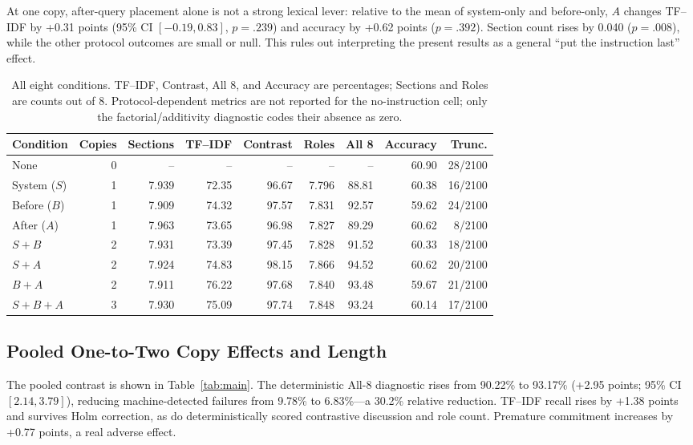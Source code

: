 \documentclass[10pt]{article}
\begin{document}
At one copy, after-query placement alone is not a strong lexical lever: relative to the mean of system-only and before-only, $A$ changes TF--IDF by +0.31 points (95\% CI $[-0.19,0.83]$, $p=.239$) and accuracy by +0.62 points ($p=.392$). Section count rises by 0.040 ($p=.008$), while the other protocol outcomes are small or null. This rules out interpreting the present results as a general ``put the instruction last'' effect.

\begin{table}[t]
\centering
\small
\setlength{\tabcolsep}{5.4pt}
\begin{tabular}{@{}lrrrrrrrr@{}}
\toprule
Condition & Copies & Sections & TF--IDF & Contrast & Roles & All 8 & Accuracy & Trunc.\\
\midrule
None & 0 & -- & -- & -- & -- & -- & 60.90 & 28/2100\\
System ($S$) & 1 & 7.939 & 72.35 & 96.67 & 7.796 & 88.81 & 60.38 & 16/2100\\
Before ($B$) & 1 & 7.909 & 74.32 & 97.57 & 7.831 & 92.57 & 59.62 & 24/2100\\
After ($A$) & 1 & 7.963 & 73.65 & 96.98 & 7.827 & 89.29 & 60.62 & 8/2100\\
$S+B$ & 2 & 7.931 & 73.39 & 97.45 & 7.828 & 91.52 & 60.33 & 18/2100\\
$S+A$ & 2 & 7.924 & 74.83 & 98.15 & 7.866 & 94.52 & 60.62 & 20/2100\\
$B+A$ & 2 & 7.911 & 76.22 & 97.68 & 7.840 & 93.48 & 59.67 & 21/2100\\
$S+B+A$ & 3 & 7.930 & 75.09 & 97.74 & 7.848 & 93.24 & 60.14 & 17/2100\\
\bottomrule
\end{tabular}
\caption{All eight conditions. TF--IDF, Contrast, All 8, and Accuracy are percentages; Sections and Roles are counts out of 8. Protocol-dependent metrics are not reported for the no-instruction cell; only the factorial/additivity diagnostic codes their absence as zero.}
\label{tab:conditions}
\end{table}
\FloatBarrier

\subsection{Pooled One-to-Two Copy Effects and Length}
The pooled contrast is shown in Table~\ref{tab:main}. The deterministic All-8 diagnostic rises from 90.22\% to 93.17\% (+2.95 points; 95\% CI $[2.14,3.79]$), reducing machine-detected failures from 9.78\% to 6.83\%---a 30.2\% relative reduction. TF--IDF recall rises by +1.38 points and survives Holm correction, as do deterministically scored contrastive discussion and role count. Premature commitment increases by +0.77 points, a real adverse effect.
\end{document}
